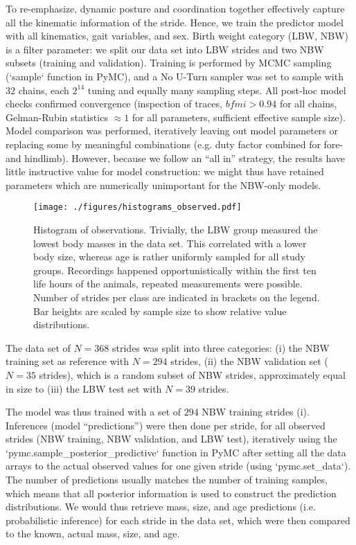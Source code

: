 To re-emphasize, dynamic posture and coordination together effectively capture all the kinematic information of the stride.
Hence, we train the predictor model with all kinematics, gait variables, and sex.
Birth weight category (LBW, NBW) is a filter parameter: we split our data set into LBW strides and two NBW subsets (training and validation).
Training is performed by MCMC sampling (`sample` function in PyMC), and a No U-Turn sampler was set to sample with \(32\) chains, each \(2^{14}\) tuning and equally many sampling steps.
All post-hoc model checks confirmed convergence (inspection of traces, \(bfmi>0.94\) for all chains, Gelman-Rubin statistics \(\approx 1\) for all parameters, sufficient effective sample size).
Model comparison was performed, iteratively leaving out model parameters or replacing some by meaningful combinations (e.g. duty factor combined for fore- and hindlimb).
However, because we follow an ``all in'' strategy, the results have little instructive value for model construction: we might thus have retained parameters which are numerically unimportant for the NBW-only models.



\begin{figure}[t]
\centering
\texttt{[image: ./figures/histograms\_observed.pdf]}
\caption{\label{fig:observations}Histogram of observations. Trivially, the LBW group measured the lowest body masses in the data set. This correlated with a lower body size, whereas age is rather uniformly sampled for all study groups. Recordings happened opportunistically within the first ten life hours of the animals, repeated measurements were possible. Number of strides per class are indicated in brackets on the legend. Bar heights are scaled by sample size to show relative value distributions.}
\end{figure}


The data set of
\(N = 368\) strides was split into three categories:
(i) the NBW training set as reference with
\(N = 294\) strides,
(ii) the NBW validation set (
\(N = 35\) strides), which is a random subset of NBW strides, approximately equal in size to
(iii) the LBW test set with
\(N = 39\) strides.

The model was thus trained with a set of \(294\) NBW training strides (i).
Inferences (model ``predictions'') were then done per stride, for all observed strides (NBW training, NBW validation, and LBW test), iteratively using the `pymc.sample\_posterior\_predictive` function in PyMC after setting all the data arrays to the actual observed values for one given stride (using `pymc.set\_data`).
The number of predictions usually matches the number of training samples, which means that all posterior information is used to construct the prediction distributions.
We would thus retrieve mass, size, and age predictions (i.e. probabilistic inference) for each stride in the data set, which were then compared to the known, actual mass, size, and age.


